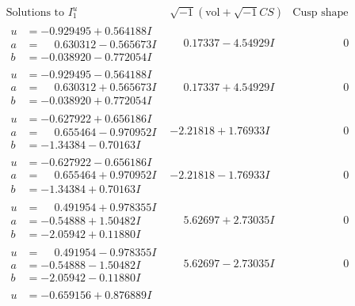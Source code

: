 \documentclass[1p]{elsarticle_modified}
\theoremstyle{definition}
\newcommand{\I}{\sqrt{-1}}
\begin{document}
$$\begin{array}{c|c|c}
\text{Solutions to }I^u_{1}& \I (\text{vol} + \sqrt{-1}CS) & \text{Cusp shape}\\
 \hline 
\begin{aligned}
u &= -0.929495 + 0.564188 I \\
a &= \phantom{-}0.630312 - 0.565673 I \\
b &= -0.038920 - 0.772054 I\end{aligned}
 & \phantom{-}0.17337 - 4.54929 I & \phantom{-0.000000 } 0 \\ \hline\begin{aligned}
u &= -0.929495 - 0.564188 I \\
a &= \phantom{-}0.630312 + 0.565673 I \\
b &= -0.038920 + 0.772054 I\end{aligned}
 & \phantom{-}0.17337 + 4.54929 I & \phantom{-0.000000 } 0 \\ \hline\begin{aligned}
u &= -0.627922 + 0.656186 I \\
a &= \phantom{-}0.655464 - 0.970952 I \\
b &= -1.34384 - 0.70163 I\end{aligned}
 & -2.21818 + 1.76933 I & \phantom{-0.000000 } 0 \\ \hline\begin{aligned}
u &= -0.627922 - 0.656186 I \\
a &= \phantom{-}0.655464 + 0.970952 I \\
b &= -1.34384 + 0.70163 I\end{aligned}
 & -2.21818 - 1.76933 I & \phantom{-0.000000 } 0 \\ \hline\begin{aligned}
u &= \phantom{-}0.491954 + 0.978355 I \\
a &= -0.54888 + 1.50482 I \\
b &= -2.05942 + 0.11880 I\end{aligned}
 & \phantom{-}5.62697 + 2.73035 I & \phantom{-0.000000 } 0 \\ \hline\begin{aligned}
u &= \phantom{-}0.491954 - 0.978355 I \\
a &= -0.54888 - 1.50482 I \\
b &= -2.05942 - 0.11880 I\end{aligned}
 & \phantom{-}5.62697 - 2.73035 I & \phantom{-0.000000 } 0 \\ \hline\begin{aligned}
u &= -0.659156 + 0.876889 I \\

\end{aligned}
\end{array}$$
\end{document}
